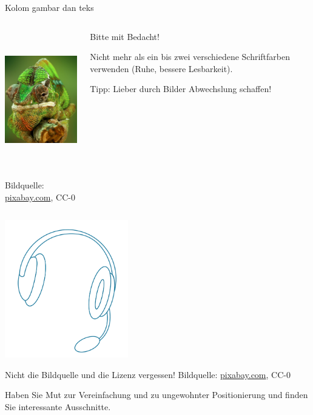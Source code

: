 \documentclass{beamer}
\begin{document}
\begin{frame}{Kolom gambar dan teks}
	\begin{columns}
		\begin{column}{5cm}
			\begin{center}
				\includegraphics[height=6cm]{figures/chamaeleon_hochformat}

				{\tiny \textcolor{digiPH_darkorange}{Bildquelle: \url{pixabay.com}, CC-0}}
			\end{center}
		\end{column}
		\begin{column}{5cm}
			\begin{center}
				\Large
				Bitte mit Bedacht!
			\end{center}
			\pause
			\begin{center}
				Nicht mehr als ein bis zwei verschiedene Schriftfarben verwenden (Ruhe, bessere Lesbarkeit).
			\end{center}
			\begin{center}
				Tipp: Lieber durch Bilder Abwechslung schaffen!
			\end{center}
		\end{column}
	\end{columns}
\end{frame}

\begin{frame}
	\begin{center}
		\includegraphics[height=6cm]{figures/kopfhoerer}

		{\tiny \textcolor{digiPH_darkorange}{Nicht die Bildquelle und die Lizenz vergessen! Bildquelle: \url{pixabay.com}, CC-0}}
	\end{center}
	\begin{center}
		Haben Sie Mut zur Vereinfachung und zu ungewohnter Positionierung und finden Sie interessante Ausschnitte.
	\end{center}
\end{frame}
\end{document}

